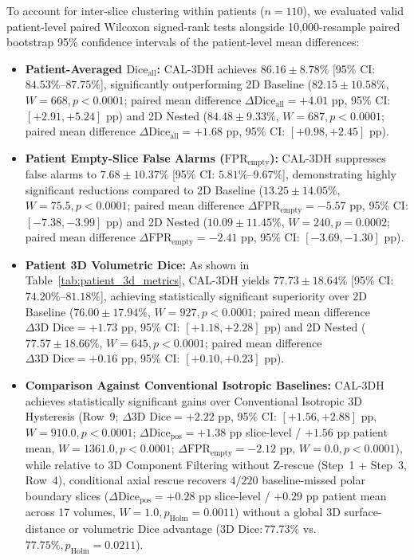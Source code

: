 \documentclass[11pt,a4paper]{article}
\begin{document}
To account for inter-slice clustering within patients ($n=110$), we evaluated valid patient-level paired Wilcoxon signed-rank tests alongside 10,000-resample paired bootstrap 95\% confidence intervals of the patient-level mean differences:
\begin{itemize}
\item \textbf{Patient-Averaged $\text{Dice}_{\text{all}}$:} CAL-3DH achieves $86.16 \pm 8.78\%$ [95\% CI: $84.53\%$--$87.75\%$], significantly outperforming 2D Baseline ($82.15 \pm 10.58\%$, $W=668, p < 0.0001$; paired mean difference $\Delta\text{Dice}_{\text{all}} = +4.01\text{ pp}$, 95\% CI: $[+2.91, +5.24]\text{ pp}$) and 2D Nested ($84.48 \pm 9.33\%$, $W=687, p < 0.0001$; paired mean difference $\Delta\text{Dice}_{\text{all}} = +1.68\text{ pp}$, 95\% CI: $[+0.98, +2.45]\text{ pp}$).
\item \textbf{Patient Empty-Slice False Alarms ($\text{FPR}_{\text{empty}}$):} CAL-3DH suppresses false alarms to $7.68 \pm 10.37\%$ [95\% CI: $5.81\%$--$9.67\%$], demonstrating highly significant reductions compared to 2D Baseline ($13.25 \pm 14.05\%$, $W=75.5, p < 0.0001$; paired mean difference $\Delta\text{FPR}_{\text{empty}} = -5.57\text{ pp}$, 95\% CI: $[-7.38, -3.99]\text{ pp}$) and 2D Nested ($10.09 \pm 11.45\%$, $W=240, p = 0.0002$; paired mean difference $\Delta\text{FPR}_{\text{empty}} = -2.41\text{ pp}$, 95\% CI: $[-3.69, -1.30]\text{ pp}$).
\item \textbf{Patient 3D Volumetric Dice:} As shown in Table~\ref{tab:patient_3d_metrics}, CAL-3DH yields $77.73 \pm 18.64\%$ [95\% CI: $74.20\%$--$81.18\%$], achieving statistically significant superiority over 2D Baseline ($76.00 \pm 17.94\%$, $W=927, p < 0.0001$; paired mean difference $\Delta\text{3D Dice} = +1.73\text{ pp}$, 95\% CI: $[+1.18, +2.28]\text{ pp}$) and 2D Nested ($77.57 \pm 18.66\%$, $W=645, p < 0.0001$; paired mean difference $\Delta\text{3D Dice} = +0.16\text{ pp}$, 95\% CI: $[+0.10, +0.23]\text{ pp}$).
\item \textbf{Comparison Against Conventional Isotropic Baselines:} CAL-3DH achieves statistically significant gains over Conventional Isotropic 3D Hysteresis (Row~9; $\Delta\text{3D Dice} = +2.22\text{ pp}$, 95\% CI: $[+1.56, +2.88]\text{ pp}$, $W = 910.0, p < 0.0001$; $\Delta\text{Dice}_{\text{pos}} = +1.38\text{ pp}$ slice-level / $+1.56\text{ pp}$ patient mean, $W = 1361.0, p < 0.0001$; $\Delta\text{FPR}_{\text{empty}} = -2.12\text{ pp}$, $W = 0.0, p < 0.0001$), while relative to 3D Component Filtering without Z-rescue (Step~1 + Step~3, Row~4), conditional axial rescue recovers $4/220$ baseline-missed polar boundary slices ($\Delta\text{Dice}_{\text{pos}} = +0.28\text{ pp}$ slice-level / $+0.29\text{ pp}$ patient mean across 17 volumes, $W = 1.0, p_{\text{Holm}} = 0.0011$) without a global 3D surface-distance or volumetric Dice advantage ($\text{3D Dice}: 77.73\%$ vs.\ $77.75\%, p_{\text{Holm}} = 0.0211$).
\end{itemize}
\end{document}
